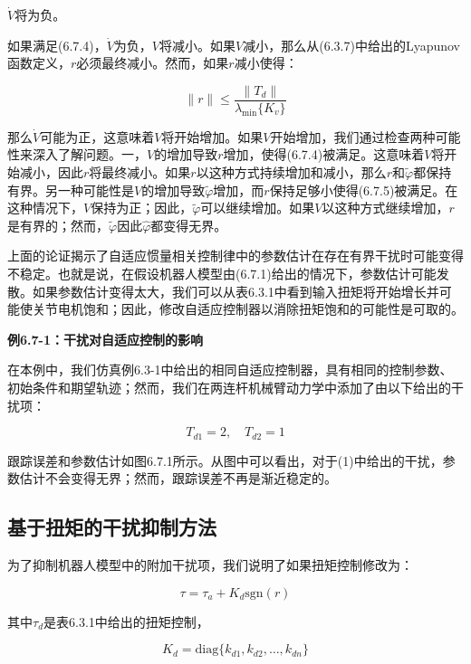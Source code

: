 \documentclass[12pt,a4paper]{ctexart}
\begin{document}
$\dot{V}$将为负。

如果满足(6.7.4)，$\dot{V}$为负，$V$将减小。如果$V$减小，那么从(6.3.7)中给出的Lyapunov函数定义，$r$必须最终减小。然而，如果$r$减小使得：

\begin{equation}\label{eq:small-r}
\|r\| \leq \frac{\|T_d\|}{\lambda_{\min}\{K_v\}}
\end{equation}

那么$\dot{V}$可能为正，这意味着$V$将开始增加。如果$V$开始增加，我们通过检查两种可能性来深入了解问题。一，$V$的增加导致$r$增加，使得(6.7.4)被满足。这意味着$V$将开始减小，因此$r$将最终减小。如果$r$以这种方式持续增加和减小，那么$r$和$\tilde{\varphi}$都保持有界。另一种可能性是$V$的增加导致$\tilde{\varphi}$增加，而$r$保持足够小使得(6.7.5)被满足。在这种情况下，$V$保持为正；因此，$\tilde{\varphi}$可以继续增加。如果$V$以这种方式继续增加，$r$是有界的；然而，$\tilde{\varphi}$因此$\hat{\varphi}$都变得无界。

上面的论证揭示了自适应惯量相关控制律中的参数估计在存在有界干扰时可能变得不稳定。也就是说，在假设机器人模型由(6.7.1)给出的情况下，参数估计可能发散。如果参数估计变得太大，我们可以从表6.3.1中看到输入扭矩将开始增长并可能使关节电机饱和；因此，修改自适应控制器以消除扭矩饱和的可能性是可取的。

\textbf{例6.7-1：干扰对自适应控制的影响}

在本例中，我们仿真例6.3-1中给出的相同自适应控制器，具有相同的控制参数、初始条件和期望轨迹；然而，我们在两连杆机械臂动力学中添加了由以下给出的干扰项：

\begin{equation}
T_{d1} = 2, \quad T_{d2} = 1
\end{equation}

跟踪误差和参数估计如图6.7.1所示。从图中可以看出，对于(1)中给出的干扰，参数估计不会变得无界；然而，跟踪误差不再是渐近稳定的。

\subsection*{基于扭矩的干扰抑制方法}

为了抑制机器人模型中的附加干扰项，我们说明了如果扭矩控制修改为：

\begin{equation}\label{eq:torque-rejection}
\tau = \tau_a + K_d \text{sgn}(r)
\end{equation}

其中$\tau_d$是表6.3.1中给出的扭矩控制，

\begin{equation}\label{eq:k_d}
K_d = \text{diag}\{k_{d1}, k_{d2}, \ldots, k_{dn}\}
\end{equation}
\end{document}
